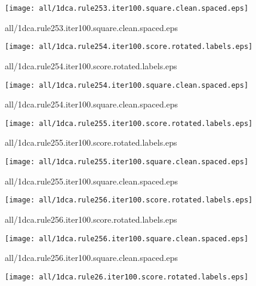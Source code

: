\documentclass{article}
\begin{document}
\begin{center}
\begin{minipage}{\textwidth}
\texttt{[image: all/1dca.rule253.iter100.square.clean.spaced.eps]}
\end{minipage}
\end{center}
{\footnotesize all/1dca.rule253.iter100.square.clean.spaced.eps}
\begin{center}
\begin{minipage}{\textwidth}
\texttt{[image: all/1dca.rule254.iter100.score.rotated.labels.eps]}
\end{minipage}
\end{center}
{\footnotesize all/1dca.rule254.iter100.score.rotated.labels.eps}
\begin{center}
\begin{minipage}{\textwidth}
\texttt{[image: all/1dca.rule254.iter100.square.clean.spaced.eps]}
\end{minipage}
\end{center}
{\footnotesize all/1dca.rule254.iter100.square.clean.spaced.eps}
\begin{center}
\begin{minipage}{\textwidth}
\texttt{[image: all/1dca.rule255.iter100.score.rotated.labels.eps]}
\end{minipage}
\end{center}
{\footnotesize all/1dca.rule255.iter100.score.rotated.labels.eps}
\begin{center}
\begin{minipage}{\textwidth}
\texttt{[image: all/1dca.rule255.iter100.square.clean.spaced.eps]}
\end{minipage}
\end{center}
{\footnotesize all/1dca.rule255.iter100.square.clean.spaced.eps}
\begin{center}
\begin{minipage}{\textwidth}
\texttt{[image: all/1dca.rule256.iter100.score.rotated.labels.eps]}
\end{minipage}
\end{center}
{\footnotesize all/1dca.rule256.iter100.score.rotated.labels.eps}
\begin{center}
\begin{minipage}{\textwidth}
\texttt{[image: all/1dca.rule256.iter100.square.clean.spaced.eps]}
\end{minipage}
\end{center}
{\footnotesize all/1dca.rule256.iter100.square.clean.spaced.eps}
\begin{center}
\begin{minipage}{\textwidth}
\texttt{[image: all/1dca.rule26.iter100.score.rotated.labels.eps]}
\end{minipage}
\end{center}
\end{document}
